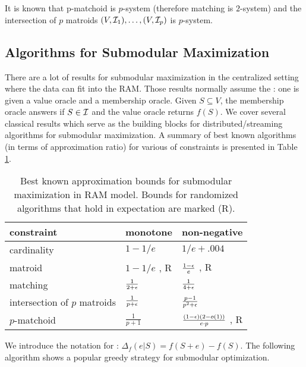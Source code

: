 It is known that p-matchoid is $p$-system (therefore matching is $2$-system) and the intersection of $p$ matroids $(V, \mathcal{I}_1), \ldots, (V, \mathcal{I}_p)$ is $p$-system. 





\subsection{Algorithms for Submodular Maximization}
There are a lot of results for submodular maximization in the centralized setting where the data can fit into the RAM. Those results normally assume the : one is given a value oracle and a membership oracle. Given $S\subseteq V$, the membership oracle answers if $S \in \mathcal{I}$ and the value oracle returns $f(S)$. We cover several classical results which serve as the building blocks for distributed/streaming algorithms for submodular maximization. A summary of best known algorithms (in terms of approximation ratio) for various of constraints is presented in Table \ref{table:centralized}.
\begin{table}[t]
\centering
\begin{tabular}{|l|l|l|}
\hline
constraint & monotone  &  non-negative \\
\hline
cardinality & $1 - 1/e$  \cite{NWF78} & $1/e + .004$ \cite{BFN+14}\\
\hline
matroid & $1 - 1/e$ \cite{CCP+11}, R & $\frac{1 - \epsilon}{e}$ \cite{FNS11}, R \\
\hline
matching & $\frac{1}{2 + \epsilon}$ \cite{FNS+11} & $\frac{1}{4 + \epsilon}$ \cite{FNS+11}\\
\hline
intersection of $p$ matroids & $\frac{1}{p + \epsilon}$ \cite{LSV10} & $\frac{p - 1}{p^2 + \epsilon}$ \cite{LSV10}\\
\hline
$p$-matchoid & $\frac{1}{p + 1}$ \cite{CCP+11,NWF78} & $\frac{(1-\epsilon)(2-o(1))}{e\cdot p}$ \cite{FNS+11,VCZ11}, R\\
\hline
\end{tabular}
\caption{Best known approximation bounds for submodular maximization in RAM model. Bounds for randomized algorithms that hold in expectation are marked (R).}
\label{table:centralized}
\end{table}






We introduce the notation for : $\Delta_f(e|S) = f(S + e) - f(S)$. The following algorithm shows a popular greedy strategy for submodular optimization.

